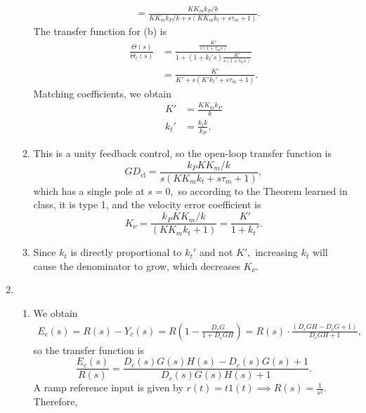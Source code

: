 \documentclass{article}
\numberwithin{equation}{section}
\begin{document}
\begin{enumerate}[label=\textbf{2.\arabic*}]
\begin{enumerate}[label=(\alph*)]
\begin{align}
            &= \frac{K K_{m} k_{P}/k}{K K_{m} k_{P}/k +  s (K K_{m} k_{t} + s \tau_{m} + 1)}.
        \end{align}
        The transfer function for (b) is 
        \begin{align}
            \frac{\Theta(s)}{\Theta_r(s)}  &= \frac{\frac{K'}{s(1+\tau_m s)}}{1+(1+k_t's)\frac{K'}{s(1+\tau_m s)}} \\ 
            &= \frac{K'}{K'  + s (K'k_t' + s\tau_{m} + 1)}.
        \end{align}
        Matching coefficients, we obtain 
        \begin{align}
            K' &= \frac{KK_mk_P}{k} \\ 
            k_t' &= \frac{k_tk}{k_P}.
        \end{align}
        \item This is a unity feedback control, so the open-loop transfer function is 
        \begin{equation}
            GD_\text{cl} = \frac{k_PK K_{m}/k}{s (K K_{m} k_{t} + s \tau_{m} + 1)},
        \end{equation}
        which has a single pole at $s=0,$ so according to the Theorem learned in class, it is type 1, and the velocity error coefficient is 
        \begin{equation}
            K_{\nu} = \frac{k_PK K_{m}/k}{(K K_{m} k_{t} + 1)} = \frac{K'}{1+k_t'}.
        \end{equation}
        \item Since $k_t$ is directly proportional to $k_t'$ and not $K',$ increasing $k_t$ will cause the denominator to grow, which decreases $K_\nu.$
    \end{enumerate}
    \item \begin{enumerate}[label=(\alph*)]
        \item We obtain 
        \begin{align}
            E_{c}(s) = R(s) - Y_{c}(s) = R\left(1-\frac{D_{c}G}{1+D_cGH}\right) = R(s) \cdot \frac{(D_{c} G H - D_{c} G + 1)}{D_{c} G H + 1},
        \end{align}
        so the transfer function is 
        \begin{equation}
            \frac{E_c(s)}{R(s)} = \frac{D_c(s)G(s)H(s) - D_c(s)G(s) + 1}{D_c(s)G(s)H(s) + 1}.
        \end{equation}
        A ramp reference input is given by $r(t) = t1(t) \implies R(s) = \frac{1}{s^2}.$ Therefore,
        \begin{align}

\end{align}
\end{enumerate}
\end{enumerate}
\end{document}
